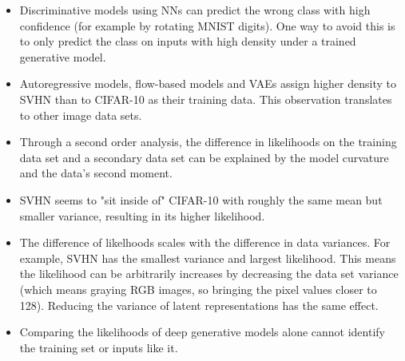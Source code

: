 \documentclass{article}
\begin{document}
\begin{itemize}
    \item Discriminative models using NNs can predict the wrong class with high confidence (for example by rotating MNIST digits). One way to avoid this is to only predict the class on inputs with high density under a trained generative model. 
    \item Autoregressive models, flow-based models and VAEs assign higher density to SVHN than to CIFAR-10 as their training data. This observation translates to other image data sets.
    \item Through a second order analysis, the difference in likelihoods on the training data set and a secondary data set can be explained by the model curvature and the data's second moment.
    \item SVHN seems to "sit inside of" CIFAR-10 with roughly the same mean but smaller variance, resulting in its higher likelihood. 
    \item The difference of likelhoods scales with the difference in data variances. For example, SVHN has the smallest variance and largest likelihood. This means the likelihood can be arbitrarily increases by decreasing the data set variance (which means graying RGB images, so bringing the pixel values closer to 128). Reducing the variance of latent representations has the same effect.
    \item Comparing the likelihoods of deep generative models alone cannot identify the training set or inputs like it.
\end{itemize}
\end{document}
